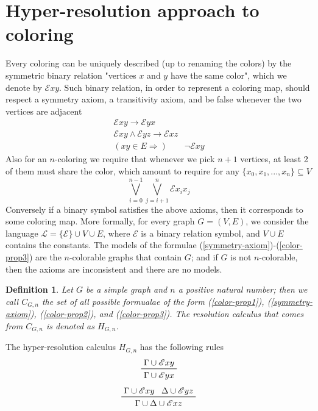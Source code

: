 \documentclass[a4paper,12pt,oneside]{book}
\newtheorem{definition}[theorem]{Definition}
\newcommand{\E}{\mathscr{E}}
\begin{document}
\section{Hyper-resolution approach to coloring}
Every coloring can be uniquely described (up to renaming the colors) by the symmetric binary relation "vertices $x$ and $y$ have the same color", which we denote by  $\E xy$. 
Such binary relation, in order to represent a coloring map, should respect a symmetry axiom, a transitivity axiom, and be false whenever the two vertices are adjacent 
\begin{gather}
\E xy \rightarrow \E yx \label{symmetry-axiom}\\
\E xy \wedge \E yz \rightarrow  \E xz \label{color-prop1}\\
( xy \in E \Rightarrow ) \qquad  \neg \E xy \label{color-prop2}
\end{gather}
Also for an $n$-coloring we require that whenever we pick $n+1$ vertices, at least 2 of them must share the color, which amount to require for any $\{ x_0, x_1, ... , x_n \} \subseteq  V$
\begin{equation} \label{color-prop3}
\bigvee_{i=0}^{n-1} \bigvee_{j=i+1}^{n} \E x_i x_j
\end{equation}
Conversely if a binary symbol satisfies the above axioms, then it corresponds to some coloring map. More formally, for every graph $G=(V,E)$, we consider the language $\mathscr{L}=\{\E\}\cup V\cup E$, where $\E$ is a binary relation symbol, and $V\cup E$ contains the constants. The models of the formulae (\ref{symmetry-axiom})-(\ref{color-prop3}) are the $n$-colorable graphs that contain $G$; and if $G$ is not $n$-colorable, then  the axioms are inconsistent and there are no models. 
\begin{definition}
Let $G$ be a simple graph and $n$ a positive natural number; then we call $C_{G,n}$ the set of all possible formualae of the form (\ref{color-prop1}), (\ref{symmetry-axiom}), (\ref{color-prop2}), and (\ref{color-prop3}). The resolution calculus that comes from $C_{G,n}$ is denoted as $H_{G,n}$.
\end{definition}
The hyper-resolution calculus $H_{G,n}$ has the following rules
\begin{equation}
\label{symm}
\prftree{\Gamma \cup \E xy }{ \Gamma\cup \E yx }
\end{equation}
\begin{equation}
\label{trans}
 \prftree{\Gamma \cup \E xy }{\Delta \cup \E yz }{\Gamma \cup \Delta \cup \E xz }
\end{equation}
\end{document}
